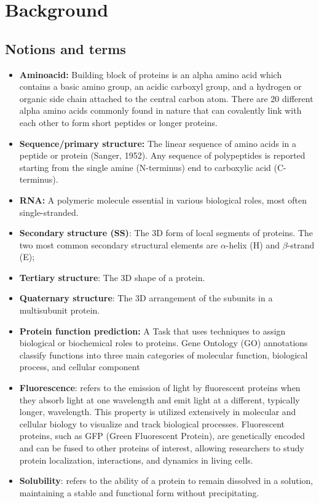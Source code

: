 \documentclass[letterpaper,spanish,reprint,nofootinbib,showkeys,aps]{revtex4-2}
\begin{document}
\section{Background}

\subsection*{Notions and terms}
\begin{itemize}
  \item \textbf{Aminoacid: } Building block of proteins is an alpha amino acid which contains a basic amino group, an acidic carboxyl group, and a hydrogen or organic side chain attached to the central carbon atom. There are 20 different alpha amino acids commonly found in nature that can covalently link with each other to form short peptides or longer proteins.
  
  \item  \textbf{Sequence/primary structure:} The linear sequence of amino acids in a peptide or protein (Sanger, 1952). Any sequence of polypeptides is reported starting from the single amine (N-terminus) end to carboxylic acid (C-terminus).
  
  \item \textbf{RNA:} A polymeric molecule essential in various biological roles, most often single-stranded.
 
  \item \textbf{Secondary structure (SS)}: The 3D form of local segments of proteins. The two most common secondary structural elements are \(\alpha\)-helix (H) and \(\beta\)-strand (E); 

  \item \textbf{Tertiary structure}: The 3D shape of a protein.
  \item \textbf{Quaternary structure}: The 3D arrangement of the subunits in a multisubunit protein.
  \item \textbf{Protein function prediction:} A Task that uses techniques to assign biological or biochemical roles to proteins. Gene Ontology (GO) annotations classify functions into three main categories of molecular function, biological process, and cellular component 
  
  \item \textbf{Fluorescence}: refers to the emission of light by fluorescent proteins when they absorb light at one wavelength and emit light at a different, typically longer, wavelength. This property is utilized extensively in molecular and cellular biology to visualize and track biological processes. Fluorescent proteins, such as GFP (Green Fluorescent Protein), are genetically encoded and can be fused to other proteins of interest, allowing researchers to study protein localization, interactions, and dynamics in living cells.
  
  \item \textbf{Solubility}: refers to the ability of a protein to remain dissolved in a solution, maintaining a stable and functional form without precipitating. 


\end{itemize}
\end{document}
